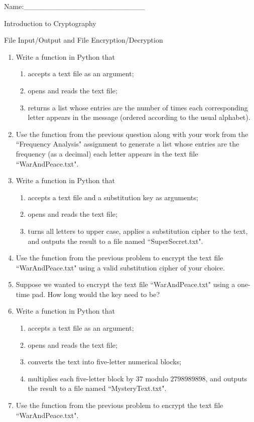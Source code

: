 \documentclass[12pt]{amsart}
\theoremstyle{definition}
\theoremstyle{remark}
\numberwithin{equation}{section}
\begin{document}
\begin{flushright}
Name:\_\_\_\_\_\_\_\_\_\_\_\_\_\_\_\_\_\_\_\_\_\_\_
\end{flushright}
\vspace{10pt}
\begin{center}
Introduction to Cryptography

File Input/Output and File Encryption/Decryption
\end{center}



\begin{enumerate}
\item Write a function in Python that
\begin{enumerate}
\item accepts a text file as an argument;
\item opens and reads the text file;
\item returns a list whose entries are the number of times each corresponding letter appears in the message (ordered according to the usual alphabet).
\end{enumerate}
\item Use the function from the previous question along with your work from the ``Frequency Analysis" assignment to generate a list whose entries are the  frequency (as a decimal) each letter appears in the text file ``WarAndPeace.txt". 
\item Write a function in Python that
\begin{enumerate}
\item accepts a text file and a substitution key as arguments;
\item opens and reads the text file;
\item turns all letters to upper case, applies a substitution cipher to the text, and outputs the result to a file named ``SuperSecret.txt".
\end{enumerate}
\item Use the function from the previous problem to encrypt the text file ``WarAndPeace.txt" using a valid substitution cipher of your choice.
\item Suppose we wanted to encrypt the text file ``WarAndPeace.txt" using a one-time pad. How long would the key need to be?
\item Write a function in Python that
\begin{enumerate}
\item accepts a text file as an argument;
\item opens and reads the text file;
\item converts the text into five-letter numerical blocks;
\item multiplies each five-letter block by $37$ modulo $2798989898$, and outputs the result to a file named ``MysteryText.txt".
\end{enumerate}
\item Use the function from the previous problem to encrypt the text file ``WarAndPeace.txt".
\end{enumerate}
\end{document}
